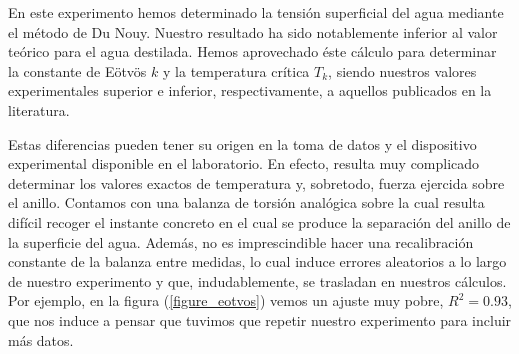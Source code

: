 En este experimento hemos determinado la tensión superficial del agua mediante el método de Du Nouy. Nuestro resultado ha sido notablemente inferior al valor teórico para el agua destilada. Hemos aprovechado éste cálculo para determinar la constante de Eötvös $k$ y la temperatura crítica $T_k$, siendo nuestros valores experimentales superior e inferior, respectivamente, a aquellos publicados en la literatura.

Estas diferencias pueden tener su origen en la toma de datos y el dispositivo experimental disponible en el laboratorio. En efecto, resulta muy complicado determinar los valores exactos de temperatura y, sobretodo, fuerza ejercida sobre el anillo. Contamos con una balanza de torsión analógica sobre la cual resulta difícil recoger el instante concreto en el cual se produce la separación del anillo de la superficie del agua. Además, no es imprescindible hacer una recalibración constante de la balanza entre medidas, lo cual induce errores aleatorios a lo largo de nuestro experimento y que, indudablemente, se trasladan en nuestros cálculos. Por ejemplo, en la figura (\ref{figure_eotvos}) vemos un ajuste muy pobre, $R^2 = 0.93$, que nos induce a pensar que tuvimos que repetir nuestro experimento para incluir más datos.